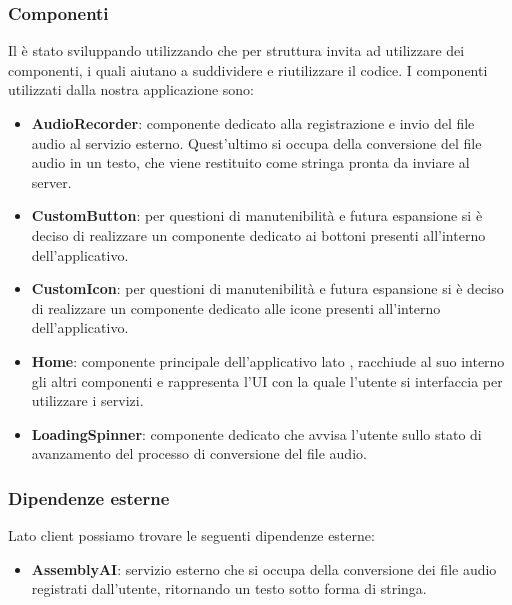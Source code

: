 \subsubsection{Componenti}
Il  è stato sviluppando utilizzando  che per struttura invita ad utilizzare dei componenti, i quali aiutano a suddividere e riutilizzare il codice. I componenti utilizzati dalla nostra applicazione sono:
\begin{itemize}
    \item \textbf{AudioRecorder}: componente dedicato alla registrazione e invio del file audio al servizio esterno. Quest'ultimo si occupa della conversione del file audio in un testo, che viene restituito come stringa pronta da inviare al server.
    \item \textbf{CustomButton}: per questioni di manutenibilità e futura espansione si è deciso di realizzare un componente dedicato ai bottoni presenti all'interno dell'applicativo. 
    \item \textbf{CustomIcon}:  per questioni di manutenibilità e futura espansione si è deciso di realizzare un componente dedicato alle icone presenti all'interno dell'applicativo. 
    \item \textbf{Home}: componente principale dell'applicativo lato , racchiude al suo interno gli altri componenti e rappresenta l'UI con la quale l'utente si interfaccia per utilizzare i servizi. 
    \item \textbf{LoadingSpinner}: componente dedicato che avvisa l'utente sullo stato di avanzamento del processo di conversione del file audio. 
\end{itemize}
\subsubsection{Dipendenze esterne}
Lato client possiamo trovare le seguenti dipendenze esterne:
\begin{itemize}
    \item \textbf{AssemblyAI}: servizio esterno che si occupa della conversione dei file audio registrati dall'utente, ritornando un testo sotto forma di stringa. 
\end{itemize}
\newpage

